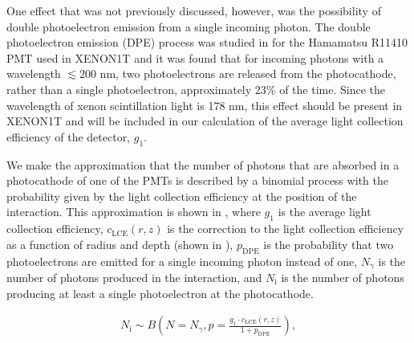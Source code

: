 One effect that was not previously discussed, however, was the possibility of double photoelectron emission from a single incoming photon.  The double photoelectron emission (DPE) process was studied in  for the Hamamatsu R11410 PMT used in XENON1T and it was found that for incoming photons with a wavelength $\lesssim 200$ nm, two photoelectrons are released from the photocathode, rather than a single photoelectron, approximately 23\% of the time.  Since the wavelength of xenon scintillation light is 178 nm, this effect should be present in XENON1T and will be included in our calculation of the average light collection efficiency of the detector, $g_1$.

We make the approximation that the number of photons that are absorbed in a photocathode of one of the PMTs is described by a binomial process with the probability given by the light collection efficiency at the position of the interaction.  This approximation is shown in , where $g_1$ is the average light collection efficiency, $c_{\textrm{LCE}}(r, z)$ is the correction to the light collection efficiency as a function of radius and depth (shown in ), $p_{\textrm{DPE}}$ is the probability that two photoelectrons are emitted for a single incoming photon instead of one, $N_{\gamma}$ is the number of photons produced in the interaction, and $N_{\textrm{i}}$ is the number of photons producing at least a single photoelectron at the photocathode.  


\begin{equation}
        \label{eqn:xe1t_binomial_lce}
        \begin{gathered}
                N_{\textrm{i}} \sim B \left( N = N_{\gamma}, p = \frac{g_1 \cdot c_{\textrm{LCE}}(r, z)}{1 + p_{\textrm{DPE}}} \right), \\
        \end{gathered}
\end{equation}


